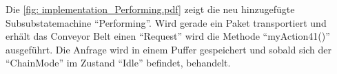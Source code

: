 \documentclass[./\jobname.tex]{subfiles}
\begin{document}
\begin{figure}[H]
	\centering
	\noindent{}
	\label{fig: implementation_ChainMode.pdf}
\end{figure}
%
\newpage
Die \autoref{fig: implementation_Performing.pdf} zeigt die neu hinzugefügte Subsubstatemachine \enquote{Performing}. Wird gerade ein Paket transportiert und erhält das Conveyor Belt einen \enquote{Request} wird die Methode \enquote{myAction41()} ausgeführt. Die Anfrage wird in einem Puffer gespeichert und sobald sich der \enquote{ChainMode} im Zustand \enquote{Idle} befindet, behandelt.
%
\end{document}
